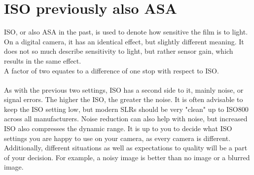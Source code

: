 \section{ISO previously also ASA}
\label{sec:ISO}

\Gls{ISO}, or also ASA in the past, is used to denote how sensitive the film is to light. On a digital camera, it has an identical effect, but slightly different meaning. It does not so much describe sensitivity to light, but rather \gls{sensor} gain, which results in the same effect.
\\
A factor of two equates to a difference of one \gls{stop} with respect to \gls{ISO}.
\\
\\
As with the previous two settings, \gls{ISO} has a second side to it, mainly noise, or signal errors. The higher the \gls{ISO}, the greater the noise. It is often advisable to keep the \gls{ISO} setting low, but modern \glspl{SLR} should be very "clean" up to ISO800 across all manufacturers. Noise reduction can also help with noise, but increased \gls{ISO} also compresses the dynamic range. It is up to you to decide what \gls{ISO} settings you are happy to use on your camera, as every camera is different. Additionally, different situations as well as expectations to quality will be a part of your decision. For example, a noisy image is better than no image or a blurred image.


